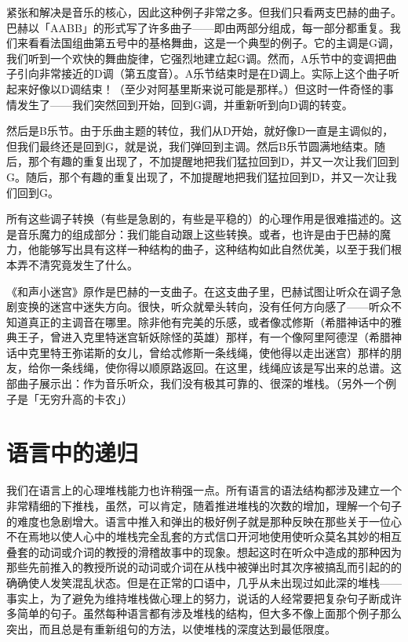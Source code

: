 \documentclass[
  12pt,
  twoside,
  openright,
  oldfontcommands,
]{memoir}
\begin{document}
紧张和解决是音乐的核心，因此这种例子非常之多。但我们只看两支巴赫的曲子。巴赫以「AABB」的形式写了许多曲子------即由两部分组成，每一部分都重复。我们来看看法国组曲第五号中的基格舞曲，这是一个典型的例子。它的主调是G调，我们听到一个欢快的舞曲旋律，它强烈地建立起G调。然而，A乐节中的变调把曲子引向非常接近的D调（第五度音）。A乐节结束时是在D调上。实际上这个曲子听起来好像以D调结束！（至少对阿基里斯来说可能是那样。）但这时一件奇怪的事情发生了------我们突然回到开始，回到G调，并重新听到向D调的转变。

然后是B乐节。由于乐曲主题的转位，我们从D开始，就好像D一直是主调似的，但我们最终还是回到G，就是说，我们弹回到主调。然后B乐节圆满地结束。随后，那个有趣的重复出现了，不加提醒地把我们猛拉回到D，并又一次让我们回到G。随后，那个有趣的重复出现了，不加提醒地把我们猛拉回到D，并又一次让我们回到G。

所有这些调子转换（有些是急剧的，有些是平稳的）的心理作用是很难描述的。这是音乐魔力的组成部分：我们能自动跟上这些转换。或者，也许是由于巴赫的魔力，他能够写出具有这样一种结构的曲子，这种结构如此自然优美，以至于我们根本弄不清究竟发生了什么。

《和声小迷宫》原作是巴赫的一支曲子。在这支曲子里，巴赫试图让听众在调子急剧变换的迷宫中迷失方向。很快，听众就晕头转向，没有任何方向感了------听众不知道真正的主调音在哪里。除非他有完美的乐感，或者像忒修斯（希腊神话中的雅典王子，曾进入克里特迷宫斩妖除怪的英雄）那样，有一个像阿里阿德涅（希腊神话中克里特王弥诺斯的女儿，曾给忒修斯一条线绳，使他得以走出迷宫）那样的朋友，给你一条线绳，使你得以顺原路返回。在这里，线绳应该是写出来的总谱。这部曲子展示出：作为音乐听众，我们没有极其可靠的、很深的堆栈。（另外一个例子是「无穷升高的卡农」）

\section{语言中的递归}

我们在语言上的心理堆栈能力也许稍强一点。所有语言的语法结构都涉及建立一个非常精细的下推栈，虽然，可以肯定，随着推进堆栈的次数的增加，理解一个句子的难度也急剧增大。语言中推入和弹出的极好例子就是那种反映在那些关于一位心不在焉地以使人心中的堆栈完全乱套的方式信口开河地使用使听众莫名其妙的相互叠套的动词或介词的教授的滑稽故事中的现象。想起这时在听众中造成的那种因为那些先前推入的教授所说的动词或介词在从栈中被弹出时其次序被搞乱而引起的的确确使人发笑混乱状态。但是在正常的口语中，几乎从未出现过如此深的堆栈------事实上，为了避免为维持堆栈做心理上的努力，说话的人经常要把复杂句子断成许多简单的句子。虽然每种语言都有涉及堆栈的结构，但大多不像上面那个例子那么突出，而且总是有重新组句的方法，以使堆栈的深度达到最低限度。
\end{document}
